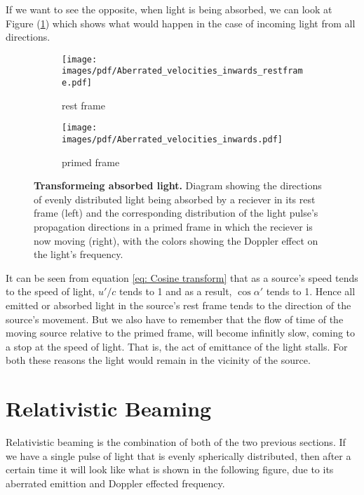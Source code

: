 If we want to see the opposite, when light is being absorbed, we can look at Figure (\ref{fig: aberrated absorbed light}) which shows what would happen in the case of incoming light from all directions.

\begin{figure}[H]
	\begin{subfigure}{.49\textwidth}
		\centering
		\texttt{[image: images/pdf/Aberrated\_velocities\_inwards\_restframe.pdf]}
		\caption{rest frame}
	\end{subfigure}
	\begin{subfigure}{.49\textwidth}
		\centering
		\texttt{[image: images/pdf/Aberrated\_velocities\_inwards.pdf]}
		\caption{primed frame}
	\end{subfigure}
	\caption{\textbf{Transformeing absorbed light.} Diagram showing the directions of evenly distributed light being absorbed by a reciever in its rest frame (left) and the corresponding distribution of the light pulse's propagation directions in a primed frame in which the reciever is now moving (right), with the colors showing the Doppler effect on the light's frequency.}
	\label{fig: aberrated absorbed light}
\end{figure}

It can be seen from equation \eqref{eq: Cosine transform} that as a source's speed tends to the speed of light, $u'/c$ tends to 1 and as a result, $\cos\alpha{'}$ tends to 1.
Hence all emitted or absorbed light in the source's rest frame tends to the direction of the source's movement.
But we also have to remember that the flow of time of the moving source relative to the primed frame, will become infinitly slow, coming to a stop at the speed of light.
That is, the act of emittance of the light stalls.
For both these reasons the light would remain in the vicinity of the source.

\section{Relativistic Beaming} \label{sect: Relativistic Beaming}

Relativistic beaming is the combination of both of the two previous sections.
If we have a single pulse of light that is evenly spherically distributed, then after a certain time it will look like what is shown in the following figure, due to its aberrated emittion and Doppler effected frequency.

